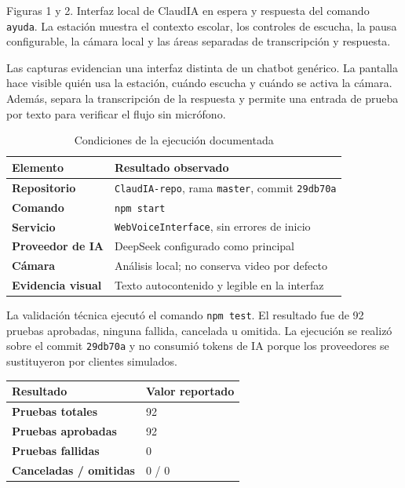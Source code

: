 \documentclass[11pt]{article}
\newcommand{\Section}[1]{\par\vspace{0.16\baselineskip}{\normalfont\normalsize\bfseries\RaggedRight #1\par}}
\newcommand{\ManualCaption}[1]{\begin{center}\fontsize{8}{9.5}\selectfont #1\end{center}}
\begin{document}
\ManualCaption{Figuras 1 y 2. Interfaz local de ClaudIA en espera y respuesta del comando \texttt{ayuda}. La estación muestra el contexto escolar, los controles de escucha, la pausa configurable, la cámara local y las áreas separadas de transcripción y respuesta.}

Las capturas evidencian una interfaz distinta de un chatbot genérico. La pantalla hace visible quién usa la estación, cuándo escucha y cuándo se activa la cámara. Además, separa la transcripción de la respuesta y permite una entrada de prueba por texto para verificar el flujo sin micrófono.

\begin{table}[H]
\centering
\caption{Condiciones de la ejecución documentada}
\begin{tabularx}{\textwidth}{@{}>{\bfseries}p{1.55in}X@{}}
\toprule
Elemento & Resultado observado \\
\midrule
Repositorio & \texttt{ClaudIA-repo}, rama \texttt{master}, commit \texttt{29db70a} \\
Comando & \texttt{npm start} \\
Servicio & \texttt{WebVoiceInterface}, sin errores de inicio \\
Proveedor de IA & DeepSeek configurado como principal \\
Cámara & Análisis local; no conserva video por defecto \\
Evidencia visual & Texto autocontenido y legible en la interfaz \\
\bottomrule
\end{tabularx}
\end{table}

\clearpage

\Section{Pruebas automatizadas y operación local}

La validación técnica ejecutó el comando \texttt{npm test}. El resultado fue de 92 pruebas aprobadas, ninguna fallida, cancelada u omitida. La ejecución se realizó sobre el commit \texttt{29db70a} y no consumió tokens de IA porque los proveedores se sustituyeron por clientes simulados.

\begin{center}
\begin{tabularx}{0.88\textwidth}{@{}>{\bfseries}p{1.55in}X@{}}
\toprule
Resultado & Valor reportado \\
\midrule
Pruebas totales & 92 \\
Pruebas aprobadas & 92 \\
Pruebas fallidas & 0 \\
Canceladas / omitidas & 0 / 0 \\
\bottomrule
\end{tabularx}
\end{center}
\end{document}
